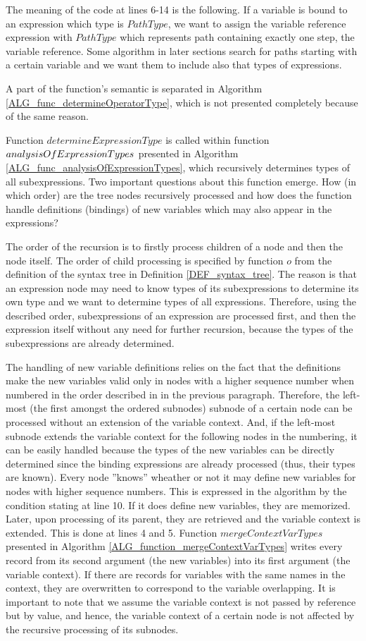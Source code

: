 The meaning of the code at lines 6-14 is the following. If a variable is bound to an expression which type is $PathType$, we want to assign the variable reference expression with $PathType$ which represents path containing exactly one step, the variable reference. Some algorithm in later sections search for paths starting with a certain variable and we want them to include also that types of expressions.	

A part of the function's semantic is separated in Algorithm \ref{ALG_func_determineOperatorType}, which is not presented completely because of the same reason.

Function $determineExpressionType$ is called within function $analysis\-Of\-Expression\-Types$ presented in Algorithm \ref{ALG_func_analysisOfExpressionTypes}, which recursively determines types of all subexpressions. Two important questions about this function emerge. How (in which order) are the tree nodes recursively processed and how does the function handle definitions (bindings) of new variables which may also appear in the expressions?

The order of the recursion is to firstly process children of a node and then the node itself. The order of child processing is specified by function $o$ from the definition of the syntax tree in Definition \ref{DEF_syntax_tree}. The reason is that an expression node may need to know types of its subexpressions to determine its own type and we want to determine types of all expressions. Therefore, using the described order, subexpressions of an expression are processed first, and then the expression itself without any need for further recursion, because the types of the subexpressions are already determined.

The handling of new variable definitions relies on the fact that the definitions make the new variables valid only in nodes with a higher sequence number when numbered in the order described in in the previous paragraph. Therefore, the left-most (the first amongst the ordered subnodes) subnode of a certain node can be processed without an extension of the variable context. And, if the left-most subnode extends the variable context for the following nodes in the numbering, it can be easily handled because the types of the new variables can be directly determined since the binding expressions are already processed (thus, their types are known). Every node ''knows'' wheather or not it may define new variables for nodes with higher sequence numbers. This is expressed in the algorithm by the condition stating at line 10. If it does define new variables, they are memorized. Later, upon processing of its parent, they are retrieved and the variable context is extended. This is done at lines 4 and 5. Function $mergeContextVarTypes$ presented in Algorithm \ref{ALG_function_mergeContextVarTypes} writes every record from its second argument (the new variables) into its first argument (the variable context). If there are records for variables with the same names in the context, they are overwritten to correspond to the variable overlapping. It is important to note that we assume the variable context is not passed by reference but by value, and hence, the variable context of a certain node is not affected by the recursive processing of its subnodes.

